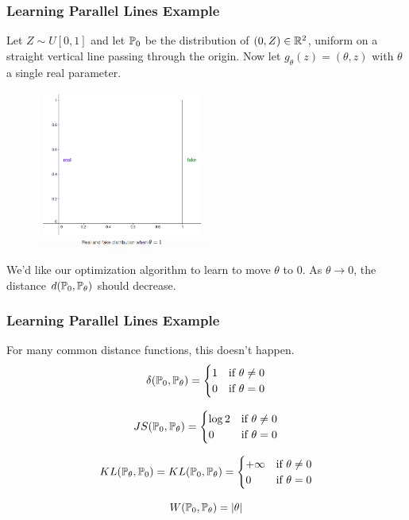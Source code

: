 \documentclass{beamer}
\begin{document}
\begin{frame}
\frametitle{Learning Parallel Lines Example}
\pause
Let $Z \sim U[0,1]$ and let $\P_{0}$ be the distribution of $(0,Z) \in \R^2$, uniform on a straight vertical line passing through the origin. Now let $g_{\theta}(z) = (\theta,z)$ with $\theta$ a single real parameter.
\pause
\begin{figure}
\centering
\includegraphics[width=0.5\textwidth]{parallel_lines.png}
\end{figure}

\pause
We'd like our optimization algorithm to learn to move $\theta$ to $0$. As $\theta \to 0$, the distance $d(\P_{0},\P_{\theta})$ should decrease.

\end{frame}

\begin{frame}
\frametitle{Learning Parallel Lines Example}
For many common distance functions, this doesn't happen.
\pause
\begin{equation*}
\delta(\P_{0},\P_{\theta}) = \begin{cases}
1 &\text{if $\theta \neq 0$}\\    
0 &\text{if $\theta = 0$}
\end{cases}
\end{equation*}

\begin{equation*}
JS(\P_{0},\P_{\theta}) = \begin{cases}
\log 2 &\text{if $\theta \neq 0$}\\    
0 &\text{if $\theta = 0$}
\end{cases}
\end{equation*}

\begin{equation*}
KL(\P_{\theta}, \P_{0}) = KL(\P_{0},\P_{\theta}) = \begin{cases}
+\infty &\text{if $\theta \neq 0$}\\    
0 &\text{if $\theta = 0$}
\end{cases}
\end{equation*}

$$W(\P_{0},\P_{\theta}) = |\theta|$$

\end{frame}
\end{document}
